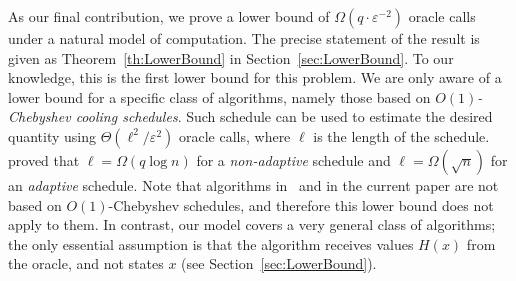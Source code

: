 \documentclass[final,12pt]{colt2018}
\begin{document}
As our final contribution, we prove a lower bound of $\Omega(q\cdot \varepsilon^{-2})$ oracle calls
under a natural model of computation. 
The precise statement of the result is given as Theorem~\ref{th:LowerBound} in Section~\ref{sec:LowerBound}.
To our knowledge, this is the first lower bound for this problem. We are only aware of a lower bound
for a specific class of algorithms, namely those based on {\em $O(1)$-Chebyshev cooling schedules}.
Such schedule can be used to estimate the desired quantity using $\Theta(\ell^2 / \varepsilon^2)$ oracle calls,
where $\ell$ is the length of the schedule. \cite{Stefankovic:JACM09} proved that  $\ell = \Omega(q \log n)$ for a {\em non-adaptive} schedule and $\ell = \Omega( \sqrt{n} )$
 for an {\em adaptive} schedule.
Note that algorithms in~\citep{Huber:Gibbs} and in the current paper are not based on $O(1)$-Chebyshev schedules, and therefore this lower bound does not apply to them. 
In contrast, our model covers a very general class of algorithms; 
the only essential assumption is that 
the algorithm receives values $H(x)$ from the oracle, and not states $x$ (see Section~\ref{sec:LowerBound}). 
\end{document}
